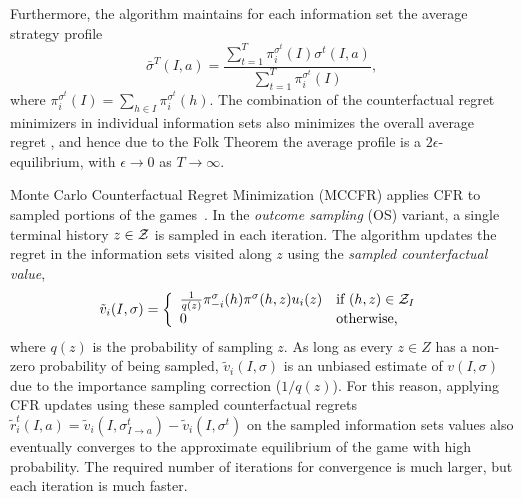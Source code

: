 Furthermore, the algorithm maintains for each information set the average   strategy profile
\begin{equation}
\bar{\sigma}^T(I,a) = \frac{\sum_{t=1}^T \pi^{\sigma^t}_i(I) \sigma^t(I,a)}{\sum_{t=1}^T \pi^{\sigma^t}_i(I)},
\end{equation}
where $\pi^{\sigma^t}_i(I) = \sum_{h \in I}\pi^{\sigma^t}_i(h)$.
The combination of the counterfactual regret minimizers in individual information sets also minimizes the overall
average regret \cite{CFR}, and hence due to the Folk Theorem the average profile is a  $2\epsilon$-equilibrium,
with $\epsilon \rightarrow 0$ as $T \rightarrow \infty$.

Monte Carlo Counterfactual Regret Minimization (MCCFR) applies CFR to sampled portions of the games~\cite{Lanctot09Sampling}.
In the {\it outcome sampling} (OS) variant, a single terminal history $z\in \mathcal{Z}$ is sampled in each iteration.
The algorithm updates the regret in the information sets visited along $z$ using the
{\it sampled counterfactual value},
\begin{equation}
\tilde{v}_i(I,\sigma) = \left\{
\begin{array}{ll}
\frac{1}{q(z)} \pi^{\sigma}_{-i}(h) \pi^{\sigma}(h,z) u_i(z) & \mbox{if } (h,z) \in \mathcal{Z}_I\\
0  & \mbox{otherwise,}
\end{array} \right.
\label{eq:scv}
\end{equation}
where $q(z)$ is the probability of sampling $z$.
As long as every $z \in Z$ has a non-zero probability of being sampled, $\tilde{v}_i(I,\sigma)$ is an unbiased estimate of $v(I,\sigma)$
due to the importance sampling correction ($1/q(z)$). For this reason, applying CFR updates using these sampled counterfactual regrets
$\tilde{r}_i^t(I,a) = \tilde{v}_i(I,\sigma^t_{I \rightarrow a}) - \tilde{v}_i(I,\sigma^t)$
on the sampled information sets values also eventually converges to the approximate equilibrium of the game with high probability.
The required number of iterations for convergence is much larger, but each iteration is much faster.



